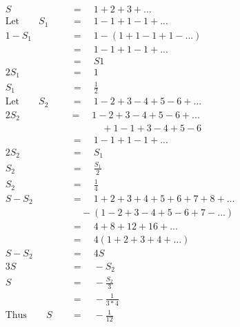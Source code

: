 \begin{align*}
S\quad&\,=\quad1+2+3+...\\
\mathrm{Let}\qquad S_1\quad&\,=\quad1-1+1-1+...\\
1-S_1\quad&\,=\quad1-(1+1-1+1-...)\\
\,&\,=\quad1-1+1-1+...\\
\,&\,=\quad S1\\
2S_1\quad&\,=\quad1\\
S_1\quad&\,=\quad\frac{1}{2}\\
\mathrm{Let}\qquad S_2\quad&\,=\quad1-2+3-4+5-6+...\\
2S_2\quad&=\quad1-2+3-4+5-6+...\\
\quad&\,\qquad\quad\,+1-1+3-4+5-6\\
\,&\,=\quad1-1+1-1+...\\
2S_2\quad&\,=\quad S_1\\
S_2\quad&\,=\quad\frac{S_1}{2}\\
S_2\quad&\,=\quad\frac{1}{4}\\
S-S_2\quad&\,=\quad1+2+3+4+5+6+7+8+...\\
\quad&\,\quad-(1-2+3-4+5-6+7-...)\\
\,&\,=\quad4+8+12+16+...\\
\,&\,=\quad4(1+2+3+4+...)\\
S-S_2\quad&\,=\quad4S\\
3S\quad&\,=\quad-S_2\\
S\quad&\,=\quad-\frac{S_2}{3}\\
\,&\,=\quad-\frac{1}{3*4}\\
\mathrm{Thus}\qquad S\quad&\,=\quad-\frac{1}{12}
\end{align*}
